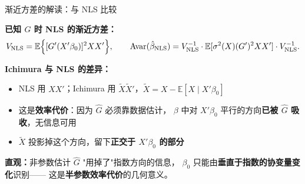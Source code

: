 \documentclass[aspectratio=169, 10pt]{beamer}
\begin{document}
\begin{frame}{渐近方差的解读：与 NLS 比较}

  \textbf{已知 $G$ 时 NLS 的渐近方差：}
  $$V_{\text{NLS}} = \mathbb{E}\Bigl\{[G'(X'\beta_0)]^2 X X'\Bigr\}, \qquad
  \text{Avar}(\hat\beta_{\text{NLS}}) = V_{\text{NLS}}^{-1} \cdot \mathbb{E}[\sigma^2(X) (G')^2 X X'] \cdot V_{\text{NLS}}^{-1}.$$

  \begin{highlightbox}
    \textbf{Ichimura 与 NLS 的差异：}
    \begin{itemize}\setlength{\itemsep}{1pt}
      \item NLS 用 $X X'$；Ichimura 用 $\tilde X \tilde X'$，$\tilde X = X - \mathbb{E}[X \mid X'\beta_0]$
      \item 这是\textbf{效率代价}：因为 $\hat G$ 必须靠数据估计，
      $\beta$ 中对 $X'\beta_0$ 平行的方向\textbf{已被 $\hat G$ 吸收}，无信息可用
      \item $\tilde X$ 投影掉这个方向，留下\textbf{正交于 $X'\beta_0$ 的部分}
    \end{itemize}
  \end{highlightbox}

  \begin{keybox}
    \textbf{直观：}非参数估计 $\hat G$ "用掉了"指数方向的信息，
    $\beta_0$ 只能由\textbf{垂直于指数的协变量变化}识别——
    这是\textbf{半参数效率代价}的几何意义。
  \end{keybox}

\end{frame}
\end{document}
